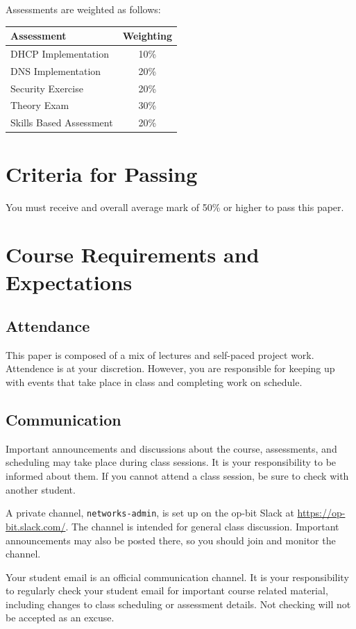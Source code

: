 \documentclass{article}
\begin{document}
Assessments are weighted as follows: \\
\begin{tabular}{|l|c|}
\hline
Assessment                  &  Weighting \\ \hline
DHCP Implementation         &  10\% \\ \hline
DNS Implementation          &  20\% \\ \hline
Security Exercise           &  20\% \\ \hline
Theory Exam                 &  30\% \\ \hline
Skills Based Assessment     &  20\% \\ \hline
\end{tabular}

\section*{Criteria for Passing}
You must receive and overall average mark of 50\% or higher to pass this paper.

\section*{Course Requirements and Expectations}
\subsection*{Attendance}
This paper is composed of a mix of lectures and self-paced project work.  Attendence is at your discretion. 
However, you are responsible for keeping up with events that take place in class and completing work on schedule. 

\subsection*{Communication}
Important announcements and discussions about the course, assessments, and scheduling may take place during class sessions.  It is your responsibility to be informed about them.  If you cannot attend a class session, be sure to check with another student.

A private channel, \texttt{networks-admin}, is set up on the op-bit Slack at \url{https://op-bit.slack.com/}.  The channel is intended for general class discussion.  Important announcements may also be posted there, so you should join and monitor the channel.

Your student email is an official communication channel. It is your responsibility to regularly check your student email for important course related material, including changes to class scheduling or assessment details. Not checking will not be accepted as an excuse.
\end{document}
